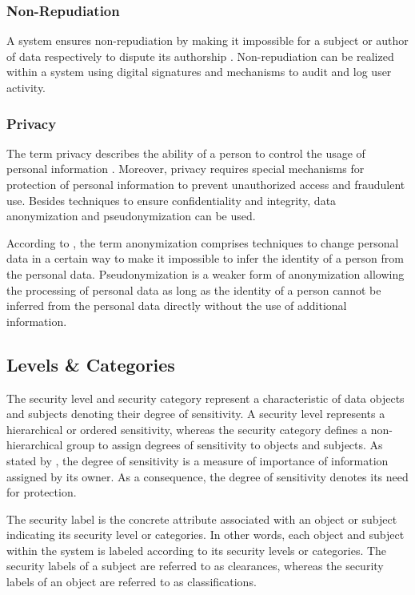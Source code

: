 \subsubsection{Non-Repudiation}
A system ensures non-repudiation by making it impossible for a subject or author of data respectively to dispute its authorship \cite{Eckert2023}.
Non-repudiation can be realized within a system using digital signatures and mechanisms to audit and log user activity.

\subsubsection{Privacy}
The term privacy describes the ability of a person to control the usage of personal information \cite{Eckert2023}.
Moreover, privacy requires special mechanisms for protection of personal information to prevent unauthorized access and fraudulent use.
Besides techniques to ensure confidentiality and integrity, data anonymization and pseudonymization can be used.

According to \citeauthor{Eckert2023} \cite{Eckert2023}, the term anonymization comprises techniques to change personal data in a certain way to make it impossible to infer the identity of a person from the personal data.
Pseudonymization is a weaker form of anonymization allowing the processing of personal data as long as the identity of a person cannot be inferred from the personal data directly without the use of additional information.

\subsection{Levels \& Categories}
The security level and security category represent a characteristic of data objects and subjects denoting their degree of sensitivity.
A security level represents a hierarchical or ordered sensitivity, whereas the security category defines a non-hierarchical group to assign degrees of sensitivity to objects and subjects.
As stated by \citeauthor{Stine2008} \cite{Stine2008}, the degree of sensitivity is a measure of importance of information assigned by its owner.
As a consequence, the degree of sensitivity denotes its need for protection.

The security label is the concrete attribute associated with an object or subject indicating its security level or categories.
In other words, each object and subject within the system is labeled according to its security levels or categories.
The security labels of a subject are referred to as clearances, whereas the security labels of an object are referred to as classifications.

